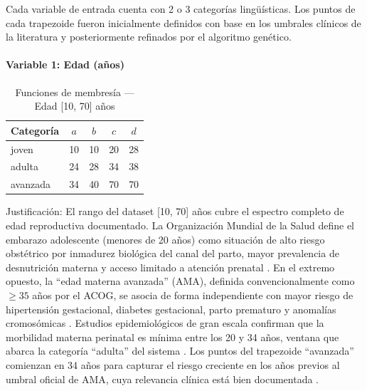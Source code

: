 \documentclass[11pt]{article}
\begin{document}
Cada variable de entrada cuenta con 2 o 3 categor\'ias ling\"u\'isticas. Los puntos de cada trapezoide fueron inicialmente definidos con base en los umbrales cl\'inicos de la literatura y posteriormente refinados por el algoritmo gen\'etico.

\paragraph{Variable 1: Edad (años)}

\begin{table}[H]
    \centering
    \caption{Funciones de membres\'ia --- Edad [10, 70] a\~nos}
    \begin{tabular}{lcccc}
        \toprule
        \textbf{Categoría} & $a$ & $b$ & $c$ & $d$ \\
        \midrule
        joven              & 10  & 10  & 20  & 28  \\
        adulta             & 24  & 28  & 34  & 38  \\
        avanzada           & 34  & 40  & 70  & 70  \\
        \bottomrule
    \end{tabular}
    \par{}
\end{table}

Justificaci\'on: El rango del dataset [10, 70] a\~nos \cite{ahmed2020} cubre el espectro completo de edad reproductiva documentado. La Organizaci\'on Mundial de la Salud define el embarazo adolescente (menores de 20 a\~nos) como situaci\'on de alto riesgo obst\'etrico por inmadurez biol\'ogica del canal del parto, mayor prevalencia de desnutrici\'on materna y acceso limitado a atenci\'on prenatal \cite{who2021adolescent}. En el extremo opuesto, la ``edad materna avanzada'' (AMA), definida convencionalmente como $\geq 35$ a\~nos por el ACOG, se asocia de forma independiente con mayor riesgo de hipertensi\'on gestacional, diabetes gestacional, parto prematuro y anomal\'ias cromosómicas \cite{acog2020}. Estudios epidemiol\'ogicos de gran escala confirman que la morbilidad materna perinatal es m\'inima entre los 20 y 34 a\~nos, ventana que abarca la categor\'ia ``adulta'' del sistema \cite{cavazos2014,yogev2010}. Los puntos del trapezoide ``avanzada'' comienzan en 34 a\~nos para capturar el riesgo creciente en los a\~nos previos al umbral oficial de AMA, cuya relevancia cl\'inica est\'a bien documentada \cite{acog2020}.
\end{document}
